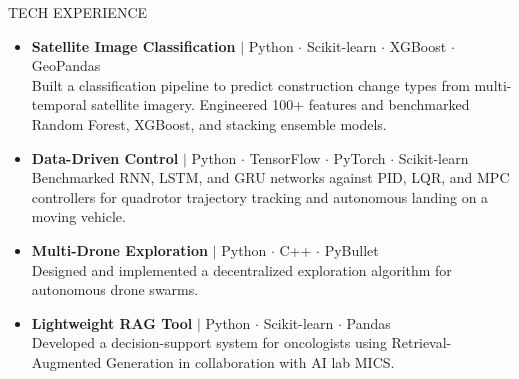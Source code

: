 \documentclass{resume}
\newcommand{\skill}[1]{\textcolor{navycustom}{#1}}
\begin{document}
\begin{rSection}{TECH EXPERIENCE}
\begin{itemize}[label=\scriptsize$\bullet$]
    \vspace{-0.6em}

    \item \textbf{Satellite Image Classification} $\mid$ 
    \skill{Python} $\cdot$ 
    \skill{Scikit-learn} $\cdot$ 
    \skill{XGBoost} $\cdot$ 
    \skill{GeoPandas} \\
    Built a classification pipeline to predict construction change types from multi-temporal satellite imagery. 
    Engineered 100+ features and benchmarked Random Forest, XGBoost, and stacking ensemble models.

    \vspace{-0.6em}

    \item \textbf{Data-Driven Control} $\mid$ 
    \skill{Python} $\cdot$ 
    \skill{TensorFlow} $\cdot$ 
    \skill{PyTorch} $\cdot$ 
    \skill{Scikit-learn}\\
    Benchmarked RNN, LSTM, and GRU networks against PID, LQR, and MPC controllers for quadrotor trajectory tracking and autonomous landing on a moving vehicle.

    \vspace{-0.6em} 

    \item \textbf{Multi-Drone Exploration} $\mid$ 
    \skill{Python} $\cdot$ 
    \skill{C++} $\cdot$ 
    \skill{PyBullet}\\
    Designed and implemented a decentralized exploration algorithm for autonomous drone swarms.

    \vspace{-0.6em} 

    \item \textbf{Lightweight RAG Tool} $\mid$ 
    \skill{Python} $\cdot$ 
    \skill{Scikit-learn} $\cdot$ 
    \skill{Pandas}\\
    Developed a decision-support system for oncologists using Retrieval-Augmented Generation in collaboration with AI lab MICS.

\end{itemize}

\vspace{-0.6em}
\end{rSection}
\end{document}
